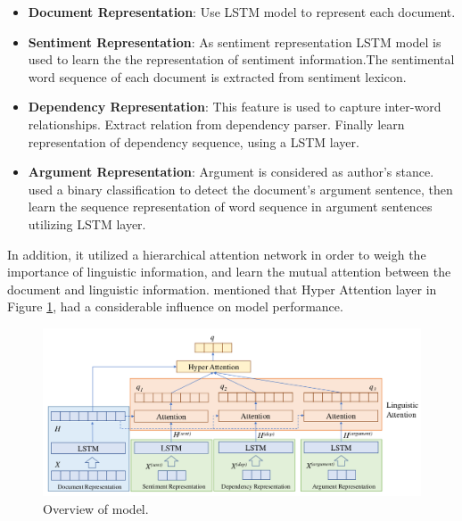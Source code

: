 	\begin{itemize}
		\item \textbf{Document Representation}: Use LSTM model to represent each document.
		\item \textbf{Sentiment Representation}: As sentiment representation LSTM model is used to learn the the representation of sentiment information.The sentimental word sequence of each document is extracted from sentiment lexicon. 
		\item \textbf{Dependency Representation}: This feature is used to capture inter-word relationships. Extract relation from dependency parser. Finally learn representation of dependency sequence, using a LSTM layer.
		\item \textbf{Argument Representation}: Argument is considered as author's stance. \cite{Hierarchical-Attention-Network} used a binary classification to detect the document's argument sentence, then learn the sequence representation of word sequence in argument sentences utilizing LSTM layer.
	\end{itemize}
	
	In addition, it utilized a hierarchical attention network in order to weigh the importance of linguistic information, and learn the mutual attention between the document and linguistic information. \cite{Hierarchical-Attention-Network} mentioned that Hyper Attention layer in Figure \ref{fig:hierarchical_att}, had a considerable influence on model performance. 
	
	\begin{figure}
		\centering
		\includegraphics[scale=0.4]{statistics/stance/hierarchial-attention-network.png}
		\caption{Overview of \cite{Hierarchical-Attention-Network} model.}
		\label{fig:hierarchical_att}
	\end{figure}
	
